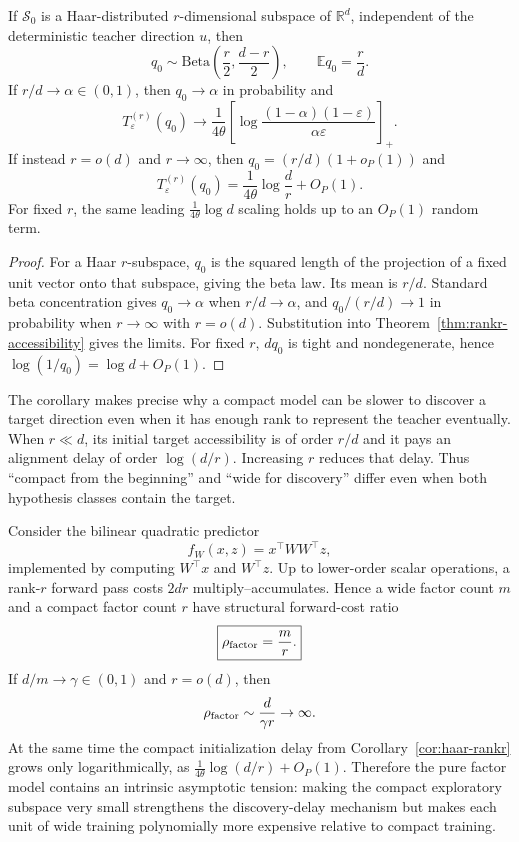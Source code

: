 \begin{corollary}\label{cor:haar-rankr}
If $\mathcal S_0$ is a Haar-distributed $r$-dimensional subspace of $\mathbb R^d$, independent of the deterministic teacher direction $u$, then
\[
\boxed{
q_0\sim\mathrm{Beta}\!\left(\frac r2,\frac{d-r}{2}\right),
\qquad
\mathbb E q_0=\frac rd.}
\]
If $r/d\to\alpha\in(0,1)$, then $q_0\to\alpha$ in probability and
\[
T_\varepsilon^{(r)}(q_0)
\to
\frac1{4\theta}
\left[
\log\frac{(1-\alpha)(1-\varepsilon)}{\alpha\varepsilon}
\right]_+.
\]
If instead $r=o(d)$ and $r\to\infty$, then $q_0=(r/d)(1+o_P(1))$ and
\[
\boxed{
T_\varepsilon^{(r)}(q_0)
=
\frac1{4\theta}\log\frac dr+O_P(1).}
\]
For fixed $r$, the same leading $\frac1{4\theta}\log d$ scaling holds up to an $O_P(1)$ random term.
\end{corollary}

\begin{proof}
For a Haar $r$-subspace, $q_0$ is the squared length of the projection of a fixed unit vector onto that subspace, giving the beta law. Its mean is $r/d$. Standard beta concentration gives $q_0\to\alpha$ when $r/d\to\alpha$, and $q_0/(r/d)\to1$ in probability when $r\to\infty$ with $r=o(d)$. Substitution into Theorem~\ref{thm:rankr-accessibility} gives the limits. For fixed $r$, $dq_0$ is tight and nondegenerate, hence $\log(1/q_0)=\log d+O_P(1)$.
\end{proof}

\begin{remark}
The corollary makes precise why a compact model can be slower to discover a target direction even when it has enough rank to represent the teacher eventually. When $r\ll d$, its initial target accessibility is of order $r/d$ and it pays an alignment delay of order $\log(d/r)$. Increasing $r$ reduces that delay. Thus ``compact from the beginning'' and ``wide for discovery'' differ even when both hypothesis classes contain the target.
\end{remark}

\begin{proposition}\label{prop:pure-factor-tension}
Consider the bilinear quadratic predictor
\[
f_W(x,z)=x^\top WW^\top z,
\]
implemented by computing $W^\top x$ and $W^\top z$. Up to lower-order scalar operations, a rank-$r$ forward pass costs $2dr$ multiply--accumulates. Hence a wide factor count $m$ and a compact factor count $r$ have structural forward-cost ratio
\[
\boxed{\rho_{\rm factor}=\frac mr.}
\]
If $d/m\to\gamma\in(0,1)$ and $r=o(d)$, then
\[
\rho_{\rm factor}\sim\frac{d}{\gamma r}\to\infty.
\]
At the same time the compact initialization delay from Corollary~\ref{cor:haar-rankr} grows only logarithmically, as $\frac1{4\theta}\log(d/r)+O_P(1)$. Therefore the pure factor model contains an intrinsic asymptotic tension: making the compact exploratory subspace very small strengthens the discovery-delay mechanism but makes each unit of wide training polynomially more expensive relative to compact training.
\end{proposition}

